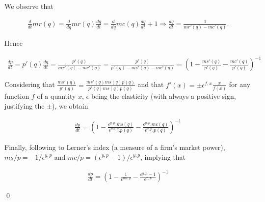 \documentclass{article}
\begin{document}
\noindent We observe that

\begin{align*}
    \frac{d}{dt}mr(q)=\frac{d}{dq}mr(q)\frac{dq}{dt}=\frac{d}{dq} mc(q)\frac{dq}{dt} + 1 \Rightarrow \frac{dq}{dt}=\frac{1}{mr'(q) - mc'(q)}. 
\end{align*}

\noindent Hence

\begin{align*}
    \frac{dp}{dt} = p'(q) \frac{dq}{dt} = \frac{p'(q)}{mr'(q) - mc'(q)}  = \frac{p'(q)}{p'(q) - ms'(q) - mc'(q)} = \left( 1 - \frac{ms'(q)}{p'(q)} - \frac{mc'(q)}{p'(q)} \right)^{-1}
\end{align*}

\noindent Considering that $\frac{ms'(q)}{p'(q)}=\frac{ms'(q)ms(q)p(q)}{p'(q)ms(q)p(q)}$ and that $f'(x)=\pm \epsilon^{f,x} \frac{x}{f(x)}$ for any function $f$ of a quantity $x$, $\epsilon$ being the elasticity (with always a positive sign, justifying the $\pm$), we obtain

\begin{align*}
    \frac{dp}{dt} = \left( 1 - \frac{\epsilon^{y,p} .ms(q)}{\epsilon^{ms,q} .p(q)} - \frac{\epsilon^{y,p} .mc(q)}{\epsilon^{x,p} .p(q)} \right)^{-1}
\end{align*}

\noindent Finally, following to Lerner's index (a measure of a firm's market power), $ms/p=-1/\epsilon^{y,p}$ and $mc/p=(\epsilon^{y,p} - 1)/\epsilon^{y,p}$, implying that

\begin{align*}
    \frac{dp}{dt} = \left( 1 - \frac{1}{\epsilon^{ms,q}} - \frac{\epsilon^{y,p} - 1}{\epsilon^{x,p}} \right)^{-1}
\end{align*}

\qed
\end{document}
